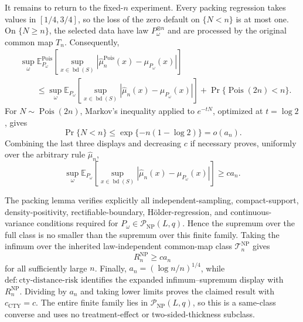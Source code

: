 It remains to return to the fixed-\(n\) experiment.  Every packing regression takes values in \([1/4,3/4]\), so the loss of the zero default on \(\{N<n\}\) is at most one.  On \(\{N\geq n\}\), the selected data have law \(P_\omega^{\otimes n}\) and are processed by the original common map \(T_n\).  Consequently,
\[
\begin{aligned}
 &\sup_\omega
 \mathbb E_{P_\omega}^{\mathrm{Pois}}\!\left[
 \sup_{x\in\operatorname{bd}(S)}
 |\widehat\mu_n^{\mathrm{Pois}}(x)-\mu_{P_\omega}(x)|
 \right]\\
 &\qquad\leq
 \sup_\omega
 \mathbb E_{P_\omega}\!\left[
 \sup_{x\in\operatorname{bd}(S)}
 |\widehat\mu_n(x)-\mu_{P_\omega}(x)|
 \right]
 +\Pr\{\operatorname{Pois}(2n)<n\}.
\end{aligned}
\]
For \(N\sim\operatorname{Pois}(2n)\), Markov's inequality applied to \(e^{-tN}\), optimized at \(t=\log2\), gives
\[
 \Pr\{N<n\}
 \leq\exp\{-n(1-\log2)\}=o(a_n).
\]
Combining the last three displays and decreasing \(c\) if necessary proves, uniformly over the arbitrary rule \(\widehat\mu_n\),
\[
 \sup_\omega
 \mathbb E_{P_\omega}\!\left[
 \sup_{x\in\operatorname{bd}(S)}
 |\widehat\mu_n(x)-\mu_{P_\omega}(x)|
 \right]
 \geq c a_n.
\]

The packing lemma verifies explicitly all independent-sampling, compact-support, density-positivity, rectifiable-boundary, H\"older-regression, and continuous-variance conditions required for \(P_\omega\in\mathcal P_{\mathrm{NP}}(L,q)\).  Hence the supremum over the full class is no smaller than the supremum over this finite family.  Taking the infimum over the inherited law-independent common-map class \(\mathcal T_n^{\mathrm{NP}}\) gives
\[
 R_n^{\mathrm{NP}}\geq c a_n
\]
for all sufficiently large \(n\).  Finally, \(a_n=(\log n/n)^{1/4}\), while \(\mathrm{def:cty\text{-}distance\text{-}risk}\) identifies the expanded infimum--supremum display with \(R_n^{\mathrm{NP}}\).  Dividing by \(a_n\) and taking lower limits proves the claimed result with \(c_{\mathrm{CTY}}=c\).  The entire finite family lies in \(\mathcal P_{\mathrm{NP}}(L,q)\), so this is a same-class converse and uses no treatment-effect or two-sided-thickness subclass.